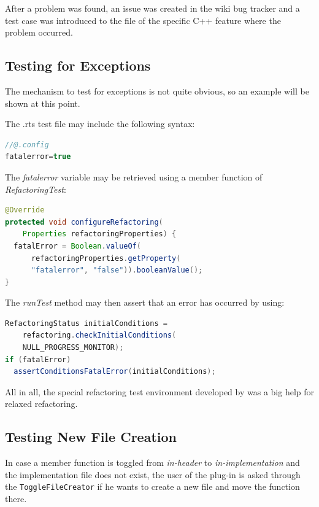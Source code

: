 After a problem was found, an issue was created in the wiki bug tracker and a
test case was introduced to the file of the specific C++ feature where the
problem occurred.

\subsection{Testing for Exceptions}
The mechanism to test for exceptions is not quite obvious, so an example will be
shown at this point. 

The .rts test file may include the following syntax:

\begin{lstlisting}[caption={Syntax to set variables inside a .rts file},
language=java]
//@.config
fatalerror=true
\end{lstlisting}

The \textit{fatalerror} variable may be retrieved using a member function of \textit{RefactoringTest}:
\begin{lstlisting}[caption={Accessing a property set in the .rts file},
language=java]
@Override
protected void configureRefactoring(
    Properties refactoringProperties) {
  fatalError = Boolean.valueOf(
      refactoringProperties.getProperty(
      "fatalerror", "false")).booleanValue();
}
\end{lstlisting}

The \textit{runTest} method may then assert that an error has occurred by using:
\begin{lstlisting}[caption={Checking for errors inside the refactoring test class},language=java]
RefactoringStatus initialConditions = 
    refactoring.checkInitialConditions(
    NULL_PROGRESS_MONITOR);
if (fatalError)
  assertConditionsFatalError(initialConditions);
\end{lstlisting}

All in all, the special refactoring test environment developed by \cite{GB06} 
was a big help for relaxed refactoring.

\subsection{Testing New File Creation}

In case a member function is toggled from \textit{in-header} to
\textit{in-implementation} and the implementation file does not exist, the user
of the plug-in is asked through the \texttt{ToggleFileCreator} if he wants to
create a new file and move the function there.

